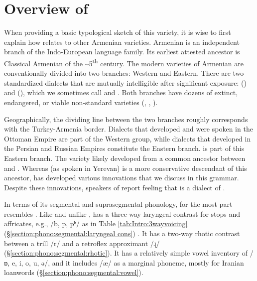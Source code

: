 \section{Overview of {\iaIA}}\label{section: intro: overview}


When providing a basic typological sketch of this variety, it is wise to first explain how {\iaIA} relates to other Armenian varieties. Armenian is an independent branch of the Indo-European language family. Its earliest attested ancestor is Classical Armenian of the \~{}5\textsuperscript{th} century.  The modern  varieties of Armenian  are conventionally divided into two branches: Western and Eastern. There are two   standardized dialects  that are mutually intelligible after significant exposure: {\swaSWA} ({\swaAbbre}) and {\seaSEA} ({\seaAbbre}), which we sometimes  call {\swaSW} and {\seaSE}. Both branches have dozens of   extinct, endangered, or viable non-standard varieties (\citealt{Adjarian-1909-ClassificationArmenianDialect, Adjarian-1911-DialectologyBook, GreppinKhachaturian-1986-HandbookArmenianDialectology}, \citealt[\S1.1]{Vaux-1998-ArmenianPhono}, \citealt{Baronian-2017-TwoProblemsArmenianPhono, Dolatian-prep-Adjarian}). 


Geographically, the dividing line between the two branches roughly corresponds with the Turkey-Armenia border. Dialects that developed and were spoken in the Ottoman Empire are part of the Western group, while dialects that developed in the Persian and Russian Empires constitute the Eastern branch.  {\iaIA} is part of this Eastern branch. The variety likely developed from a common ancestor between {\seaSE} and {\iaIA}. Whereas {\seaSE}  (as spoken in Yerevan) is a more conservative descendant of this ancestor, {\iaIA} has developed various innovations that we discuss in this grammar.  Despite these innovations, speakers of   {\iaIA} report  feeling that   {\iaIA} is a dialect of {\seaSE}. 

In terms of its segmental and suprasegmental phonology, {\iaIA} for the most part resembles   {\seaSEA}. Like {\seaSE} and unlike {\swaSW}, {\iaIA} has a three-way laryngeal contrast for stops and affricates, e.g., /b, p, pʰ/ as in Table \ref{tab:Intro:3wayvoicing} (\S\ref{section:phono:segmental:laryngeal cons}) \citep{Hacopian-2003-ThreeWayVOTCOntrastArmenian}. It has a two-way rhotic contrast between a trill /r/ and a retroflex approximant /ɻ/ (\S\ref{section:phono:segmental:rhotic}). It has a relatively simple vowel inventory of /ɒ, e, i, o, u, ə/, and it includes /æ/ as a marginal phoneme, mostly for Iranian loanwords (\S\ref{section:phono:segmental:vowel}).\largerpage

